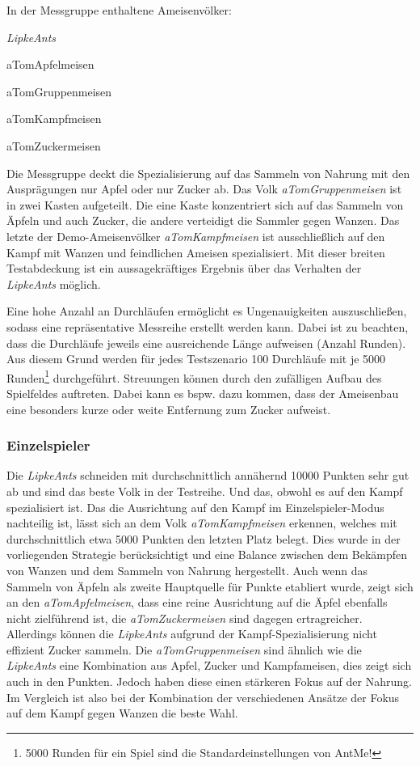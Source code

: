 \pagebreak
In der Messgruppe enthaltene Ameisenvölker:
\begin{compactitem}
   \item \textit{LipkeAnts}
   \item aTomApfelmeisen
   \item aTomGruppenmeisen
   \item aTomKampfmeisen
   \item aTomZuckermeisen
\end{compactitem}

Die Messgruppe deckt die Spezialisierung auf das Sammeln von Nahrung mit den Ausprägungen nur Apfel oder nur Zucker ab. Das Volk \textit{aTomGruppenmeisen} ist in zwei Kasten aufgeteilt. Die eine Kaste konzentriert sich auf das Sammeln von Äpfeln und auch Zucker, die andere verteidigt die Sammler gegen Wanzen. Das letzte der Demo-Ameisenvölker \textit{aTomKampfmeisen} ist ausschließlich auf den Kampf mit Wanzen und feindlichen Ameisen spezialisiert. Mit dieser breiten Testabdeckung ist ein aussagekräftiges Ergebnis über das Verhalten der \textit{LipkeAnts} möglich.

Eine hohe Anzahl an Durchläufen ermöglicht es Ungenauigkeiten auszuschließen, sodass eine repräsentative Messreihe erstellt werden kann. Dabei ist zu beachten, dass die Durchläufe jeweils eine ausreichende Länge aufweisen (Anzahl Runden). Aus diesem Grund werden für jedes Testszenario 100 Durchläufe mit je 5000 Runden\footnote{5000 Runden für ein Spiel sind die Standardeinstellungen von AntMe!} durchgeführt. Streuungen können durch den zufälligen Aufbau des Spielfeldes auftreten. Dabei kann es bspw. dazu kommen, dass der Ameisenbau eine besonders kurze oder weite Entfernung zum Zucker aufweist.

\subsubsection{Einzelspieler}
Die \textit{LipkeAnts} schneiden mit durchschnittlich annähernd 10000 Punkten sehr gut ab und sind das beste Volk in der Testreihe. Und das, obwohl es auf den Kampf spezialisiert ist. Das die Ausrichtung auf den Kampf im Einzelspieler-Modus nachteilig ist, lässt sich an dem Volk \textit{aTomKampfmeisen} erkennen, welches mit durchschnittlich etwa 5000 Punkten den letzten Platz belegt. Dies wurde in der vorliegenden Strategie berücksichtigt und eine Balance zwischen dem Bekämpfen von Wanzen und dem Sammeln von Nahrung hergestellt. Auch wenn das Sammeln von Äpfeln als zweite Hauptquelle für Punkte etabliert wurde, zeigt sich an den \textit{aTomApfelmeisen}, dass eine reine Ausrichtung auf die Äpfel ebenfalls nicht zielführend ist, die \textit{aTomZuckermeisen} sind dagegen ertragreicher. Allerdings können die \textit{LipkeAnts} aufgrund der Kampf-Spezialisierung nicht effizient Zucker sammeln. Die \textit{aTomGruppenmeisen} sind ähnlich wie die \textit{LipkeAnts} eine Kombination aus Apfel, Zucker und Kampfameisen, dies zeigt sich auch in den Punkten. Jedoch haben diese einen stärkeren Fokus auf der Nahrung. Im Vergleich ist also bei der Kombination der verschiedenen Ansätze der Fokus auf dem Kampf gegen Wanzen die beste Wahl.

